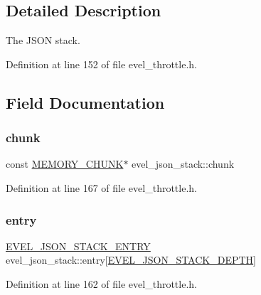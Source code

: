\subsection{Detailed Description}
The J\+S\+ON stack. 

Definition at line 152 of file evel\+\_\+throttle.\+h.



\subsection{Field Documentation}
\hypertarget{structevel__json__stack_ab94b10ac7e31de53b2086c97ef6f70b9}{}\label{structevel__json__stack_ab94b10ac7e31de53b2086c97ef6f70b9} 
\subsubsection{\texorpdfstring{chunk}{chunk}}
{\footnotesize\ttfamily const \hyperlink{evel__internal_8h_a552c2b2d2e73d39eb2d79328296f7d5f}{M\+E\+M\+O\+R\+Y\+\_\+\+C\+H\+U\+NK}$\ast$ evel\+\_\+json\+\_\+stack\+::chunk}



Definition at line 167 of file evel\+\_\+throttle.\+h.

\hypertarget{structevel__json__stack_a18a5fdb90795b73d7df945d9829060e9}{}\label{structevel__json__stack_a18a5fdb90795b73d7df945d9829060e9} 
\subsubsection{\texorpdfstring{entry}{entry}}
{\footnotesize\ttfamily \hyperlink{evel__throttle_8h_a939516501c869cb7bf42624ecedc0d72}{E\+V\+E\+L\+\_\+\+J\+S\+O\+N\+\_\+\+S\+T\+A\+C\+K\+\_\+\+E\+N\+T\+RY} evel\+\_\+json\+\_\+stack\+::entry\mbox{[}\hyperlink{evel__throttle_8h_ab296e08c356d8b4c8ab601866127a5f9}{E\+V\+E\+L\+\_\+\+J\+S\+O\+N\+\_\+\+S\+T\+A\+C\+K\+\_\+\+D\+E\+P\+TH}\mbox{]}}



Definition at line 162 of file evel\+\_\+throttle.\+h.

\hypertarget{structevel__json__stack_adf0214de1c5281c7625b38deb2f36ae5}{}\label{structevel__json__stack_adf0214de1c5281c7625b38deb2f36ae5} 
